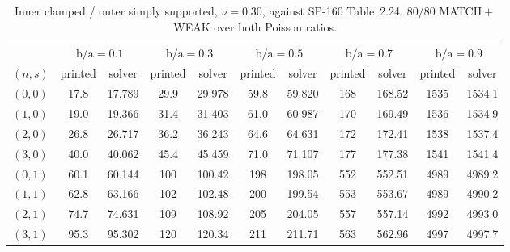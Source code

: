 \documentclass[11pt]{article}
\newcommand{\ba}{\mbox{b/a}}
\begin{document}
\begin{table}[htbp]\centering\footnotesize
\caption{Inner clamped / outer simply supported, $\nu=0.30$, against
SP-160 Table~2.24. 80/80 MATCH${}+{}$WEAK over both Poisson ratios.}
\label{tab:sm-t224-nu30}
\begin{tabular}{lcccccccccc}
\toprule
& \multicolumn{2}{c}{$\ba=0.1$} & \multicolumn{2}{c}{$\ba=0.3$}
& \multicolumn{2}{c}{$\ba=0.5$} & \multicolumn{2}{c}{$\ba=0.7$}
& \multicolumn{2}{c}{$\ba=0.9$}\\
\cmidrule(lr){2-3}\cmidrule(lr){4-5}\cmidrule(lr){6-7}\cmidrule(lr){8-9}\cmidrule(lr){10-11}
$(n,s)$ & printed & solver & printed & solver & printed & solver
& printed & solver & printed & solver\\
\midrule
$(0,0)$ & 17.8 & 17.789 & 29.9 & 29.978 & 59.8 & 59.820 & 168 & 168.52 & 1535 & 1534.1 \\
$(1,0)$ & 19.0 & 19.366 & 31.4 & 31.403 & 61.0 & 60.987 & 170 & 169.49 & 1536 & 1534.9 \\
$(2,0)$ & 26.8 & 26.717 & 36.2 & 36.243 & 64.6 & 64.631 & 172 & 172.41 & 1538 & 1537.4 \\
$(3,0)$ & 40.0 & 40.062 & 45.4 & 45.459 & 71.0 & 71.107 & 177 & 177.38 & 1541 & 1541.4 \\
$(0,1)$ & 60.1 & 60.144 & 100 & 100.42 & 198 & 198.05 & 552 & 552.51 & 4989 & 4989.2 \\
$(1,1)$ & 62.8 & 63.166 & 102 & 102.48 & 200 & 199.54 & 553 & 553.67 & 4989 & 4990.2 \\
$(2,1)$ & 74.7 & 74.631 & 109 & 108.92 & 205 & 204.05 & 557 & 557.14 & 4992 & 4993.0 \\
$(3,1)$ & 95.3 & 95.302 & 120 & 120.34 & 211 & 211.71 & 563 & 562.96 & 4997 & 4997.7 \\
\bottomrule
\end{tabular}
\end{table}
\end{document}

